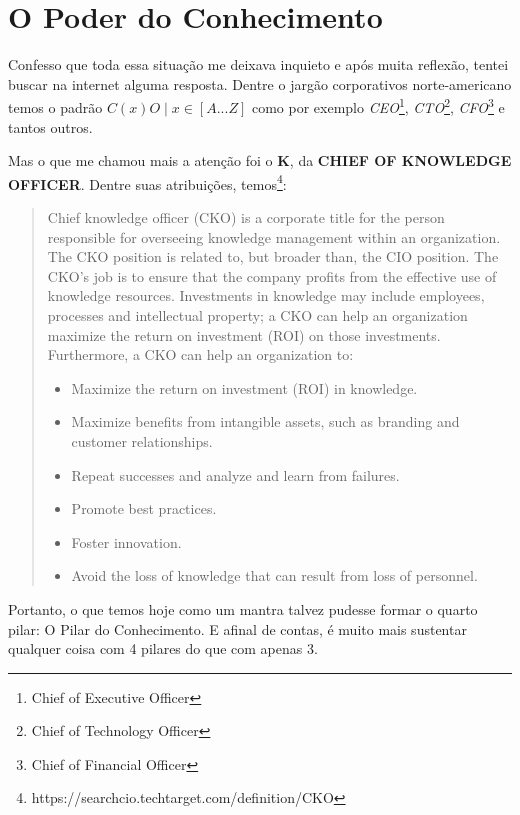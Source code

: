 \section{O Poder do Conhecimento}

Confesso que toda essa situação me deixava inquieto e após muita reflexão, tentei buscar na internet alguma resposta. Dentre o jargão corporativos norte-americano temos o padrão $C(x)O \; | \; x \in [A...Z]$ como por exemplo \emph{CEO}\footnote{Chief of Executive Officer}, \emph{CTO}\footnote{Chief of Technology Officer}, \emph{CFO}\footnote{Chief of Financial Officer} e tantos outros. 

Mas o que me chamou mais a atenção foi o \textbf{K}, da \textbf{CHIEF OF KNOWLEDGE OFFICER}. Dentre suas atribuições, temos\footnote{https://searchcio.techtarget.com/definition/CKO}:

\begin{quote}
    Chief knowledge officer (CKO) is a corporate title for the person responsible for overseeing knowledge management within an organization. The CKO position is related to, but broader than, the CIO position. The CKO's job is to ensure that the company profits from the effective use of knowledge resources. Investments in knowledge may include employees, processes and intellectual property; a CKO can help an organization maximize the return on investment (ROI) on those investments.
    Furthermore, a CKO can help an organization to:

    \begin{itemize}
        \item Maximize the return on investment (ROI) in knowledge.
        \item Maximize benefits from intangible assets, such as branding and customer relationships.
        \item Repeat successes and analyze and learn from failures.
        \item Promote best practices.
        \item Foster innovation.
        \item Avoid the loss of knowledge that can result from loss of personnel.
    \end{itemize}
\end{quote}

Portanto, o que temos hoje como um mantra talvez pudesse formar o quarto pilar: O Pilar do Conhecimento. E afinal de contas, é muito mais sustentar qualquer coisa com 4 pilares do que com apenas 3.

